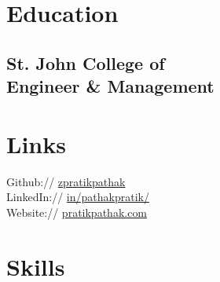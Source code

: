 \documentclass[]{Resume}
\begin{document}
%
%
\lastupdated

%
%

%
%

\begin{minipage}[t]{0.33\textwidth} 


\section{Education} 

\subsection{St. John College of \\
Engineer \& Management}
\sectionsep



\section{Links} 
Github:// \href{https://github.com/zpratikpathak}{zpratikpathak} \\
LinkedIn://  \href{https://www.linkedin.com/in/pathakpratik/}{in/pathakpratik/} \\
Website://  \href{https://pratikpathak.com/}{pratikpathak.com}




\section{Skills}

\end{minipage}
\end{document}
